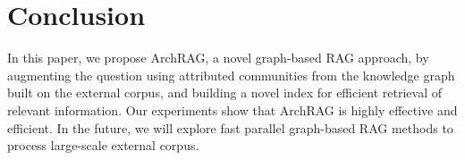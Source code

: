 \section{Conclusion}
\label{sec:conclusion}

In this paper, we propose ArchRAG, a novel graph-based RAG approach, by augmenting the question using attributed communities from the knowledge graph built on the external corpus, and building a novel index for efficient retrieval of relevant information.
%
Our experiments show that ArchRAG is highly effective and efficient.
% 
In the future, we will explore fast parallel graph-based RAG methods to process large-scale external corpus.

